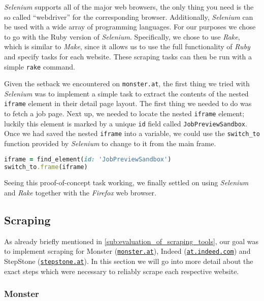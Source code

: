 \documentclass[runningheads]{llncs}
\begin{document}
\textit{Selenium} supports all of the major web browsers, the only thing you need is the so called “webdriver” for the corresponding browser. Additionally, \textit{Selenium} can be used with a wide array of programming languages. For our purposes we chose to go with the Ruby version of \textit{Selenium}. Specifically, we chose to use \textit{Rake}, which is similar to \textit{Make}, since it allows us to use the full functionality of \textit{Ruby} and specify tasks for each website. These scraping tasks can then be run with a simple \texttt{rake} command.

Given the setback we encountered on \texttt{monster.at}, the first thing we tried with \textit{Selenium} was to implement a simple task to extract the contents of the nested \texttt{iframe} element in their detail page layout. The first thing we needed to do was to fetch a job page. Next up, we needed to locate the nested \texttt{iframe} element; luckily this element is marked by a unique \texttt{id} field called \texttt{JobPreviewSandbox}. Once we had saved the nested \texttt{iframe} into a variable, we could use the \texttt{switch\_to} function provided by \textit{Selenium} to change to it from the main frame.

\begin{lstlisting}[language=Ruby]
iframe = find_element(id: 'JobPreviewSandbox')
switch_to.frame(iframe)
\end{lstlisting}

Seeing this proof-of-concept task working, we finally settled on using \textit{Selenium} and \textit{Rake} together with the \textit{Firefox} web browser.

\subsection{Scraping}
\label{sub:scraping}

As already briefly mentioned in \autoref{sub:evaluation_of_scraping_tools}, our goal was to implement scraping for Monster (\href{https://www.monster.at/}{\texttt{monster.at}}), Indeed (\href{https://at.indeed.com/}{\texttt{at.indeed.com}}) and StepStone (\href{https://www.stepstone.at/}{\texttt{stepstone.at}}). In this section we will go into more detail about the exact steps which were necessary to reliably scrape each respective website.

\subsubsection{Monster}
\label{subsub:monster}
\end{document}
